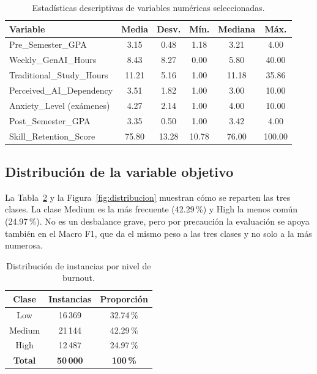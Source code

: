 \documentclass[11pt,letterpaper,twoside]{article}
\begin{document}
\begin{table}[H]
\centering
\caption{Estadísticas descriptivas de variables numéricas seleccionadas.}
\label{tab:descriptivas}
\small
\begin{tabular}{lccccc}
\toprule
\textbf{Variable} & \textbf{Media} & \textbf{Desv.} & \textbf{Mín.} & \textbf{Mediana} & \textbf{Máx.} \\
\midrule
Pre\_Semester\_GPA        & 3.15  & 0.48  & 1.18  & 3.21  & 4.00 \\
Weekly\_GenAI\_Hours      & 8.43  & 8.27  & 0.00  & 5.80  & 40.00 \\
Traditional\_Study\_Hours & 11.21 & 5.16  & 1.00  & 11.18 & 35.86 \\
Perceived\_AI\_Dependency & 3.51  & 1.82  & 1.00  & 3.00  & 10.00 \\
Anxiety\_Level (exámenes) & 4.27  & 2.14  & 1.00  & 4.00  & 10.00 \\
Post\_Semester\_GPA       & 3.35  & 0.50  & 1.00  & 3.42  & 4.00 \\
Skill\_Retention\_Score   & 75.80 & 13.28 & 10.78 & 76.00 & 100.00 \\
\bottomrule
\end{tabular}
\end{table}

\subsection{Distribución de la variable objetivo}
La Tabla~\ref{tab:clases} y la Figura~\ref{fig:distribucion} muestran cómo se reparten las tres clases. La clase Medium es la más frecuente (42.29\,\%) y High la menos común (24.97\,\%). No es un desbalance grave, pero por precaución la evaluación se apoya también en el Macro F1, que da el mismo peso a las tres clases y no solo a la más numerosa.

\begin{table}[H]
\centering
\caption{Distribución de instancias por nivel de burnout.}
\label{tab:clases}
\begin{tabular}{ccc}
\toprule
\textbf{Clase} & \textbf{Instancias} & \textbf{Proporción} \\
\midrule
Low    & 16\,369 & 32.74\,\% \\
Medium & 21\,144 & 42.29\,\% \\
High   & 12\,487 & 24.97\,\% \\
\midrule
\textbf{Total} & \textbf{50\,000} & \textbf{100\,\%} \\
\bottomrule
\end{tabular}
\end{table}
\end{document}
